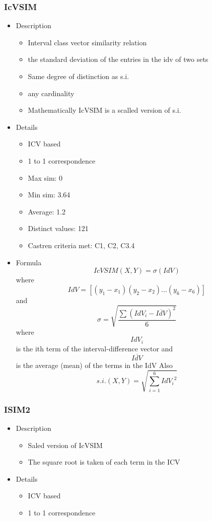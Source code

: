 \documentclass{article}
\begin{document}
\subsubsection{IcVSIM}
\label{sec-6-5-2}
\begin{itemize}

\item Description
\label{sec-6-5-2-1}%
\begin{itemize}
\item Interval class vector similarity relation
\item the standard deviation of the entries in the idv of two sets
\item Same degree of distinction as s.i.
\item any cardinality
\item Mathematically IcVSIM is a scalled version of s.i.
\end{itemize}

\item Details
\label{sec-6-5-2-2}%
\begin{itemize}
\item ICV based
\item 1 to 1 correspondence
\item Max sim: 0
\item Min sim: 3.64
\item Average: 1.2
\item Distinct values: 121
\item Castren criteria met: C1, C2, C3.4
\end{itemize}

\item Formula\\
\label{sec-6-5-2-3}%
$$ IcVSIM\left(X,Y\right)=\sigma\left(IdV\right) $$
where 
$$ IdV=[(y_{1}-x_{1})(y_{2}-x_{2})...(y_{6}-x_{6})] $$
and
$$ \sigma=\sqrt{\frac{\sum(IdV_{i}-\overline{IdV})^{2}}{6}} $$
where
$$IdV_{i}$$ is the ith term of the interval-difference vector and
$$\overline {IdV}$$ is the average (mean) of the terms in the IdV
Also
$$ s.i.(X,Y)=\sqrt{\sum_{i=1}^{6}{IdV_{i}}^{2}} $$
\end{itemize} %
\subsubsection{ISIM2}
\label{sec-6-5-3}
\begin{itemize}

\item Description
\label{sec-6-5-3-1}%
\begin{itemize}
\item Saled version of IcVSIM
\item The square root is taken of each term in the ICV
\end{itemize}

\item Details
\label{sec-6-5-3-2}%
\begin{itemize}
\item ICV based
\item 1 to 1 correspondence
\end{itemize}
\end{itemize} %
\end{document}
